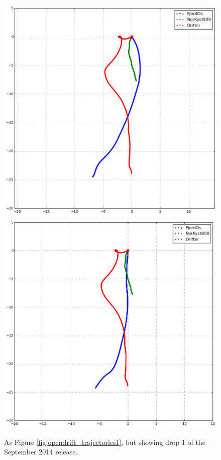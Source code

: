 \begin{figure}[htb]
	\centerline{
		\includegraphics*[width=.5\textwidth]{Figurer/opendrift/skillscore/2014drop1i0}
		\includegraphics*[width=.5\textwidth]{Figurer/opendrift/skillscore/2014drop1i0_24h}
		}
	\caption{\small As Figure \ref{fig:opendrift_trajectories1}, but showing drop 1 of the September 2014 release.}
	\label{fig:opendrift_trajectories2014}
\end{figure}


